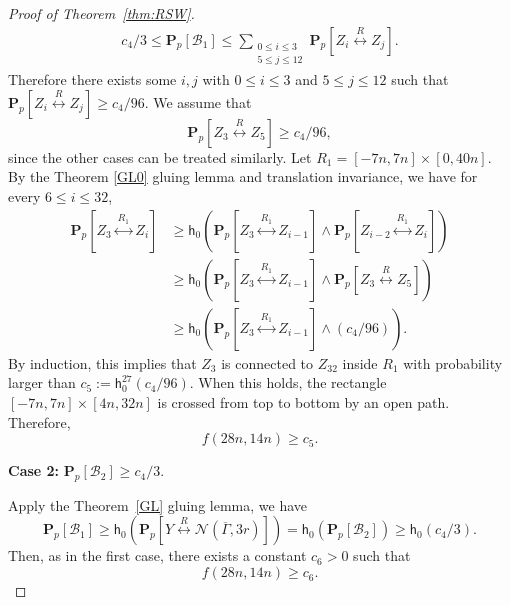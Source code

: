 \documentclass[12pt, twoside,a4paper,reqno]{amsart}
\theoremstyle{plain}
\theoremstyle{remark}
\theoremstyle{definition}
\newcommand{\PP}{\mathbf{P}}
\newcommand{\Pp}[1]{\PP_p \left [ #1 \right ]}
\newcommand{\lr}[1][]{\overset{\:#1\:}\longleftrightarrow}
\newcommand{\cal}{\mathcal}
\newcommand{\ol}{\overline}
\begin{document}
\begin{proof}[Proof of Theorem~\ref{thm:RSW}]
      \begin{align}
        \label{eq:51}
        c_4/3\le \Pp{\cal B_1}\le \sum_{\substack{0\le i\le3\\5\le j\le 12}}\Pp{Z_i\lr[R]Z_j}.
      \end{align}
      Therefore there exists some $i,j$ with $0\le i\le 3$ and $5\le j\le 12$ such that $\Pp{
        Z_i\lr[R]Z_j}\ge c_4/96$. We assume that
      \begin{equation}
        \label{eq:52}
        \Pp{Z_3\lr[R]Z_5}\ge c_4/96,
      \end{equation}
      since the other cases can be treated similarly. Let $R_1=[-7n,7n]\times[0,40n]$.
      By the Theorem \ref{GL0} gluing lemma and translation invariance, we have for every $6\le i \le 32$,
      \begin{align}
        \label{eq:53}
        \Pp{Z_3\lr[R_1]Z_{i}} &\ge \mathsf
        h_0(\Pp{Z_3\lr[R_1]Z_{i-1}}\wedge\Pp{Z_{i-2}\lr[R_1]Z_{i}})\\ &\ge \mathsf
        h_0(\Pp{Z_3\lr[R_1]Z_{i-1}}\wedge\Pp{Z_{3}\lr[R]Z_{5}})\\
        &\ge \mathsf
        h_0(\Pp{Z_3\lr[R_1]Z_{i-1}}\wedge (c_4/96)).
      \end{align}
      By induction, this implies that $Z_3$ is connected to $Z_{32}$ inside
      $R_1$ with probability larger than $c_5:=\mathsf h_0^{27}(c_4/96)$. When this
      holds, the rectangle $[-7n,7n]\times[4n,32n]$ is crossed from top to
      bottom by an open path. Therefore,
      \begin{equation}
        \label{eq:54}
       f(28n,14n)\ge c_5.
      \end{equation}





    \textbf{Case 2:} $\Pp{\cal B_2}\ge c_4/3$.

    Apply the Theorem~\ref{GL} gluing lemma, we have
   \begin{equation}
     \label{eq:2}
     \Pp{\mathcal B_1}\ge  \mathsf h_0(\Pp{Y\lr[R] \mathcal
     N(\ol \Gamma,3r)}) =\mathsf h_0(\Pp{\cal B_2}) \ge \mathsf h_0(c_4/3).
   \end{equation}
   Then, as in the first case, there exists a constant $c_6>0$ such
   that
\begin{equation}
        \label{eq:33}
        {f(28n,14n)}\ge c_6.
      \end{equation}



\end{proof}
\end{document}
